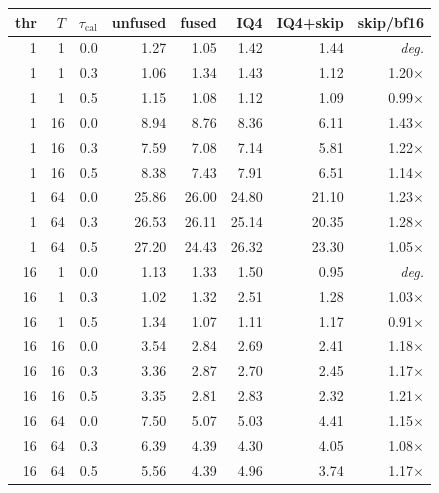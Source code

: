 \begin{tabular}{rrrrrrrr}
\toprule
thr & $T$ & $\tau_{\mathrm{cal}}$ & unfused & fused & IQ4 & IQ4+skip & skip/bf16 \\
\midrule
1 & 1 & 0.0 & 1.27 & 1.05 & 1.42 & 1.44 & \textit{deg.} \\
1 & 1 & 0.3 & 1.06 & 1.34 & 1.43 & 1.12 & 1.20$\times$ \\
1 & 1 & 0.5 & 1.15 & 1.08 & 1.12 & 1.09 & 0.99$\times$ \\
1 & 16 & 0.0 & 8.94 & 8.76 & 8.36 & 6.11 & 1.43$\times$ \\
1 & 16 & 0.3 & 7.59 & 7.08 & 7.14 & 5.81 & 1.22$\times$ \\
1 & 16 & 0.5 & 8.38 & 7.43 & 7.91 & 6.51 & 1.14$\times$ \\
1 & 64 & 0.0 & 25.86 & 26.00 & 24.80 & 21.10 & 1.23$\times$ \\
1 & 64 & 0.3 & 26.53 & 26.11 & 25.14 & 20.35 & 1.28$\times$ \\
1 & 64 & 0.5 & 27.20 & 24.43 & 26.32 & 23.30 & 1.05$\times$ \\
16 & 1 & 0.0 & 1.13 & 1.33 & 1.50 & 0.95 & \textit{deg.} \\
16 & 1 & 0.3 & 1.02 & 1.32 & 2.51 & 1.28 & 1.03$\times$ \\
16 & 1 & 0.5 & 1.34 & 1.07 & 1.11 & 1.17 & 0.91$\times$ \\
16 & 16 & 0.0 & 3.54 & 2.84 & 2.69 & 2.41 & 1.18$\times$ \\
16 & 16 & 0.3 & 3.36 & 2.87 & 2.70 & 2.45 & 1.17$\times$ \\
16 & 16 & 0.5 & 3.35 & 2.81 & 2.83 & 2.32 & 1.21$\times$ \\
16 & 64 & 0.0 & 7.50 & 5.07 & 5.03 & 4.41 & 1.15$\times$ \\
16 & 64 & 0.3 & 6.39 & 4.39 & 4.30 & 4.05 & 1.08$\times$ \\
16 & 64 & 0.5 & 5.56 & 4.39 & 4.96 & 3.74 & 1.17$\times$ \\
\bottomrule
\end{tabular}
